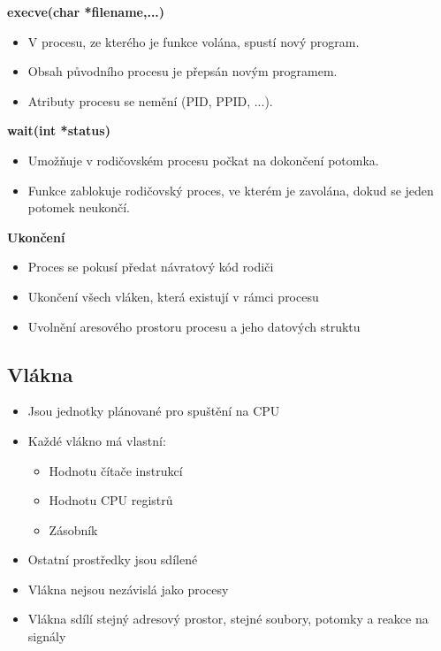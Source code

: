 \documentclass{szzclass}
\begin{document}
\textbf{execve(char *filename,...)}
\begin{itemize}
    \item V procesu, ze kterého je funkce volána, spustí nový program.
    \item Obsah původního procesu je přepsán novým programem.
    \item Atributy procesu se nemění (PID, PPID, ...).
\end{itemize}

\textbf{wait(int *status)}
\begin{itemize}
    \item Umožňuje v rodičovském procesu počkat na dokončení potomka.
    \item Funkce zablokuje rodičovský proces, ve kterém je zavolána, dokud se jeden potomek neukončí.
\end{itemize}

\textbf{Ukončení}
\begin{itemize}
    \item Proces se pokusí předat návratový kód rodiči
    \item Ukončení všech vláken, která existují v rámci procesu
    \item Uvolnění aresového prostoru procesu a jeho datových struktu
\end{itemize}

\subsection{Vlákna}

\begin{itemize}
    \item Jsou jednotky plánované pro spuštění na CPU
    \item Každé vlákno má vlastní:
    \begin{itemize}
        \item Hodnotu čítače instrukcí
        \item Hodnotu CPU registrů
        \item Zásobník
    \end{itemize}
    \item Ostatní prostředky jsou sdílené
    \item Vlákna nejsou nezávislá jako procesy
    \item Vlákna sdílí stejný adresový prostor, stejné soubory, potomky a reakce na signály
\end{itemize}
\end{document}

